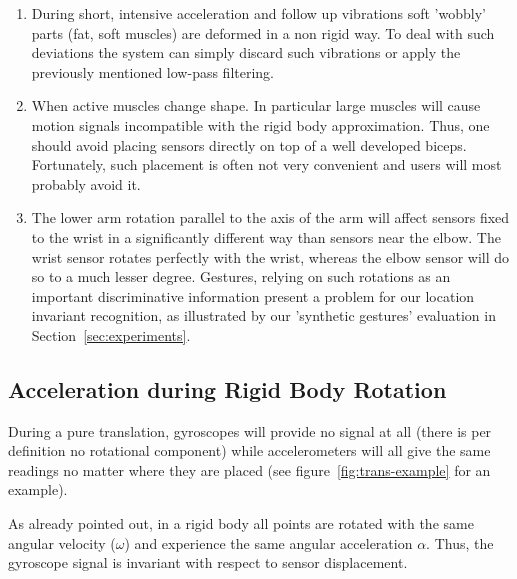\begin{enumerate}
\item During short, intensive acceleration and  follow up vibrations
  soft 'wobbly' parts (fat, soft muscles) are deformed in a non rigid
  way. To deal with such deviations the system can simply discard such vibrations or
  apply the previously mentioned low-pass filtering.
\item  When active muscles change shape. In particular large muscles
  will cause motion signals incompatible with the rigid body
  approximation. Thus, one should avoid placing sensors
  directly on top of a well developed biceps. Fortunately, such
  placement is often not very convenient and users will most probably avoid it.
\item The lower arm rotation parallel to the axis of the arm will
  affect sensors fixed to the wrist in a significantly different way
  than sensors near the elbow. The wrist sensor rotates perfectly with the
  wrist, whereas the elbow sensor will do so to a much lesser
  degree. Gestures, relying on such rotations as an important
  discriminative information present a problem for our location invariant recognition,
  as illustrated by our 'synthetic gestures' evaluation in Section~\ref{sec:experiments}. 
\end{enumerate}

\subsection{Acceleration during Rigid Body Rotation}
During a pure translation, gyroscopes will provide no signal at all
(there is per definition no rotational component) while accelerometers will all give the same readings no matter where they are placed (see figure~\ref{fig:trans-example} for an example). 

As already pointed out, in a rigid body
all points are rotated with the same angular velocity ($\omega$) and experience the same angular
acceleration $\alpha$.   Thus, the gyroscope signal is invariant with
respect to sensor displacement. 

